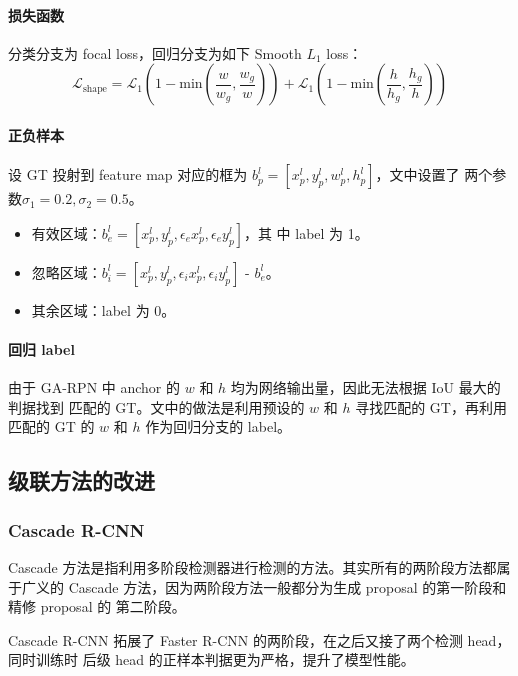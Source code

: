 \paragraph{损失函数}
分类分支为 focal loss，回归分支为如下 Smooth $L_1$ loss：
\begin{equation}
  \mathcal{L}_{\mathrm{shape}} = \mathcal{L}_1 \left( 1 - \mathrm{min}\left( \frac{w}{w_g}, \frac{w_g}{w} \right) \right) + \mathcal{L}_1 \left( 1 - \mathrm{min} \left( \frac{h}{h_g}, \frac{h_g}{h} \right) \right)
\end{equation}

\paragraph{正负样本}
设 GT 投射到 feature map 对应的框为 $b_p^l =[x_p^l, y_p^l, w_p^l, h_p^l]$，文中设置了
两个参数$\sigma_1 = 0.2, \sigma_2 = 0.5$。

\begin{itemize}
  \item 有效区域：$b_e^l=[x_p^l, y_p^l, \epsilon_e x_p^l, \epsilon_e y_p^l]$，其
    中 label 为 1。
  \item 忽略区域：$b_i^l=[x_p^l, y_p^l, \epsilon_i x_p^l, \epsilon_i y_p^l]$ -
    $b_e^l$。
  \item 其余区域：label 为 0。
\end{itemize}

\paragraph{回归 label}
由于 GA-RPN 中 anchor 的 $w$ 和 $h$ 均为网络输出量，因此无法根据 IoU 最大的判据找到
匹配的 GT。文中的做法是利用预设的 $w$ 和 $h$ 寻找匹配的 GT，再利用匹配的 GT 的 $w$ 和
$h$ 作为回归分支的 label。

\subsection{级联方法的改进}

\subsubsection{Cascade R-CNN}
\label{subsub:cascade-rcnn}

Cascade 方法是指利用多阶段检测器进行检测的方法。其实所有的两阶段方法都属于广义的
Cascade 方法，因为两阶段方法一般都分为生成 proposal 的第一阶段和精修 proposal 的
第二阶段。

Cascade R-CNN 拓展了 Faster R-CNN 的两阶段，在之后又接了两个检测 head，同时训练时
后级 head 的正样本判据更为严格，提升了模型性能。

